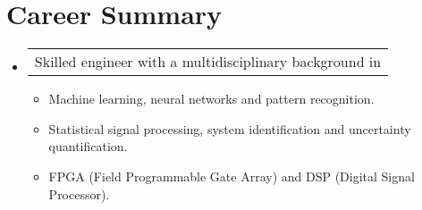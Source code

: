 \section{Career Summary}

\begin{itemize}[leftmargin=0.15in, label={}] %
    \item   \begin{tabular*}{0.2\textwidth}{l} Skilled engineer with a multidisciplinary background in \end{tabular*}\vspace{-7pt} %
            \begin{itemize} %
                \item{Machine learning, neural networks and pattern recognition. \vspace{-2pt}} %
                \item{Statistical signal processing, system identification and uncertainty quantification. \vspace{-2pt}} %
                \item{FPGA (Field Programmable Gate Array) and DSP (Digital Signal Processor). \vspace{-2pt}} %
            \end{itemize}\vspace{-5pt}
\end{itemize} %
